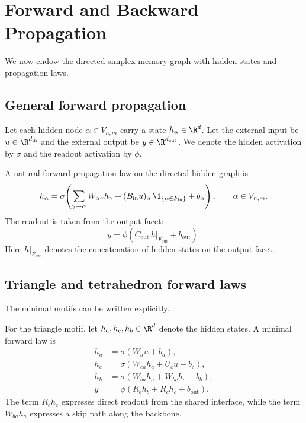 \section{Forward and Backward Propagation}
\label{sec:propagation}

We now endow the directed simplex memory graph with hidden states and propagation laws.

\subsection{General forward propagation}

Let each hidden node $\alpha\in V_{n,m}$ carry a state $h_\alpha\in\R^d$. Let the external input be $u\in\R^{d_{\mathrm{in}}}$ and the external output be $y\in\R^{d_{\mathrm{out}}}$. We denote the hidden activation by $\sigma$ and the readout activation by $\phi$.

A natural forward propagation law on the directed hidden graph is
\begin{equation}\label{eq:general-forward}
 h_\alpha
 =
 \sigma\!\left(
 \sum_{\gamma\to\alpha} W_{\alpha\gamma} h_\gamma
 +
 (B_{\mathrm{in}}u)_\alpha\,\1_{\{\alpha\in F_{\mathrm{in}}\}}
 +
 b_\alpha
 \right),
 \qquad \alpha\in V_{n,m}.
\end{equation}
The readout is taken from the output facet:
\begin{equation}\label{eq:general-readout}
 y
 =
 \phi\!\left(
 C_{\mathrm{out}}\, h|_{F_{\mathrm{out}}}
 +
 b_{\mathrm{out}}
 \right).
\end{equation}
Here $h|_{F_{\mathrm{out}}}$ denotes the concatenation of hidden states on the output facet.

\subsection{Triangle and tetrahedron forward laws}

The minimal motifs can be written explicitly.

\begin{example}
For the triangle motif, let $h_a,h_c,h_b\in\R^d$ denote the hidden states. A minimal forward law is
\begin{align}
 h_a &= \sigma(W_a u + b_a), \label{eq:triangle-a}\\
 h_c &= \sigma(W_{ca} h_a + U_c u + b_c), \label{eq:triangle-c}\\
 h_b &= \sigma(W_{ba} h_a + W_{bc} h_c + b_b), \label{eq:triangle-b}\\
 y &= \phi(R_b h_b + R_c h_c + b_{\mathrm{out}}). \label{eq:triangle-y}
\end{align}
The term $R_c h_c$ expresses direct readout from the shared interface, while the term $W_{ba}h_a$ expresses a skip path along the backbone.
\end{example}

